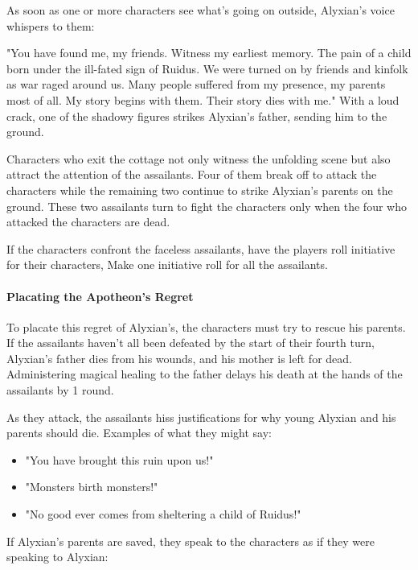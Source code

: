 \documentclass[letterpaper, 11pt, bg=full, twocolumn]{dndbook}
\begin{document}
As soon as one or more characters see what's going on outside, Alyxian's voice whispers to them:

\begin{DndReadAloud}
"You have found me, my friends. Witness my earliest memory. The pain of a child born under the ill-fated sign of Ruidus. We were turned on by friends and kinfolk as war raged around us. Many people suffered from my presence, my parents most of all. My story begins with them. Their story dies with me."
With a loud crack, one of the shadowy figures strikes Alyxian's father, sending him to the ground.
\end{DndReadAloud}

Characters who exit the cottage not only witness the unfolding scene but also attract the attention of the assailants. Four of them break off to attack the characters while the remaining two continue to strike Alyxian's parents on the ground. These two assailants turn to fight the characters only when the four who attacked the characters are dead.

If the characters confront the faceless assailants, have the players roll initiative for their characters, Make one initiative roll for all the assailants.

\paragraph{Placating the Apotheon's Regret}

To placate this regret of Alyxian's, the characters must try to rescue his parents. If the assailants haven't all been defeated by the start of their fourth turn, Alyxian's father dies from his wounds, and his mother is left for dead. Administering magical healing to the father delays his death at the hands of the assailants by 1 round.

As they attack, the assailants hiss justifications for why young Alyxian and his parents should die. Examples of what they might say:

\begin{itemize}
\item "You have brought this ruin upon us!"
\item "Monsters birth monsters!"
\item "No good ever comes from sheltering a child of Ruidus!"
\end{itemize}

If Alyxian's parents are saved, they speak to the characters as if they were speaking to Alyxian:
\end{document}
